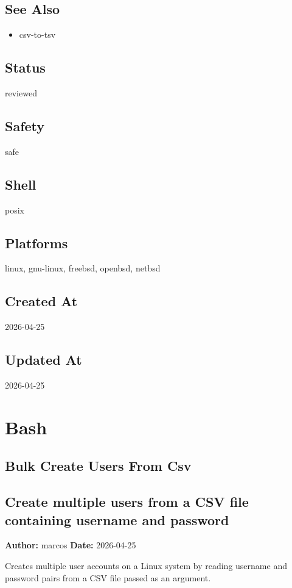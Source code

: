\documentclass[openany]{book}
\begin{document}
\section*{See Also}
\begin{itemize}
  \item csv-to-tsv
\end{itemize}

\section*{Status}
reviewed

\section*{Safety}
safe

\section*{Shell}
posix

\section*{Platforms}
linux, gnu-linux, freebsd, openbsd, netbsd

\section*{Created At}
2026-04-25

\section*{Updated At}
2026-04-25

\chapter{Bash}

\section{Bulk Create Users From Csv}
\section*{Create multiple users from a CSV file containing username and password}
\textbf{Author:} marcos \hfill \textbf{Date:} 2026-04-25

\noindent Creates multiple user accounts on a Linux system by reading username and password pairs from a CSV file passed as an argument.
\end{document}
